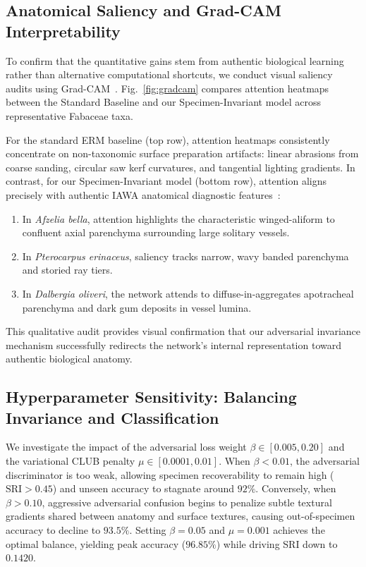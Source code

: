 \documentclass[a4paper,fleqn]{cas-sc}
\begin{document}
\subsection{Anatomical Saliency and Grad-CAM Interpretability}
To confirm that the quantitative gains stem from authentic biological learning rather than alternative computational shortcuts, we conduct visual saliency audits using Grad-CAM~\cite{gradcam}. Fig.~\ref{fig:gradcam} compares attention heatmaps between the Standard Baseline and our Specimen-Invariant model across representative Fabaceae taxa.

For the standard ERM baseline (top row), attention heatmaps consistently concentrate on non-taxonomic surface preparation artifacts: linear abrasions from coarse sanding, circular saw kerf curvatures, and tangential lighting gradients. In contrast, for our Specimen-Invariant model (bottom row), attention aligns precisely with authentic IAWA anatomical diagnostic features~\cite{iawa}:
\begin{enumerate}
    \item In \textit{Afzelia bella}, attention highlights the characteristic winged-aliform to confluent axial parenchyma surrounding large solitary vessels.
    \item In \textit{Pterocarpus erinaceus}, saliency tracks narrow, wavy banded parenchyma and storied ray tiers.
    \item In \textit{Dalbergia oliveri}, the network attends to diffuse-in-aggregates apotracheal parenchyma and dark gum deposits in vessel lumina.
\end{enumerate}
This qualitative audit provides visual confirmation that our adversarial invariance mechanism successfully redirects the network's internal representation toward authentic biological anatomy.

\subsection{Hyperparameter Sensitivity: Balancing Invariance and Classification}
We investigate the impact of the adversarial loss weight $\beta \in [0.005, 0.20]$ and the variational CLUB penalty $\mu \in [0.0001, 0.01]$. When $\beta < 0.01$, the adversarial discriminator is too weak, allowing specimen recoverability to remain high ($\mathrm{SRI} > 0.45$) and unseen accuracy to stagnate around $92\%$. Conversely, when $\beta > 0.10$, aggressive adversarial confusion begins to penalize subtle textural gradients shared between anatomy and surface textures, causing out-of-specimen accuracy to decline to $93.5\%$. Setting $\beta = 0.05$ and $\mu = 0.001$ achieves the optimal balance, yielding peak accuracy ($\mathbf{96.85\%}$) while driving SRI down to $\mathbf{0.1420}$.
\end{document}
